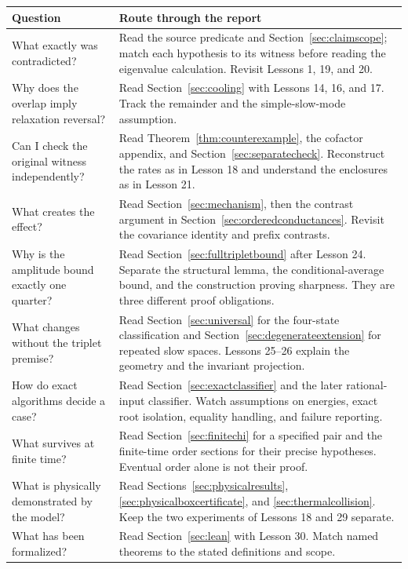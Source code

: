 \begin{longtable}{>{\raggedright\arraybackslash}p{}>{\raggedright\arraybackslash}p{}}
\toprule Question & Route through the report\\\midrule
\endhead
What exactly was contradicted? & Read the source predicate and
Section~\ref{sec:claimscope}; match each hypothesis to its witness before
reading the eigenvalue calculation. Revisit Lessons 1, 19, and 20.\\[5pt]
Why does the overlap imply relaxation reversal? & Read
Section~\ref{sec:cooling} with Lessons 14, 16, and 17. Track the remainder
and the simple-slow-mode assumption.\\[5pt]
Can I check the original witness independently? & Read
Theorem~\ref{thm:counterexample}, the cofactor appendix, and
Section~\ref{sec:separatecheck}. Reconstruct the rates as in Lesson 18 and
understand the enclosures as in Lesson 21.\\[5pt]
What creates the effect? & Read Section~\ref{sec:mechanism}, then the
contrast argument in Section~\ref{sec:orderedconductances}. Revisit the
covariance identity and prefix contrasts.\\[5pt]
Why is the amplitude bound exactly one quarter? & Read
Section~\ref{sec:fulltripletbound} after Lesson 24. Separate the structural
lemma, the conditional-average bound, and the construction proving
sharpness. They are three different proof obligations.\\[5pt]
What changes without the triplet premise? & Read
Section~\ref{sec:universal} for the four-state classification and
Section~\ref{sec:degenerateextension} for repeated slow spaces.
Lessons 25--26 explain the geometry and the invariant projection.\\[5pt]
How do exact algorithms decide a case? & Read
Section~\ref{sec:exactclassifier} and the later rational-input classifier.
Watch assumptions on energies, exact root isolation, equality handling,
and failure reporting.\\[5pt]
What survives at finite time? & Read Section~\ref{sec:finitechi} for a
specified pair and the finite-time order sections for their precise
hypotheses. Eventual order alone is not their proof.\\[5pt]
What is physically demonstrated by the model? & Read
Sections~\ref{sec:physicalresults}, \ref{sec:physicalboxcertificate}, and
\ref{sec:thermalcollision}. Keep the two experiments of Lessons 18 and
29 separate.\\[5pt]
What has been formalized? & Read Section~\ref{sec:lean} with Lesson 30.
Match named theorems to the stated definitions and scope.\\
\bottomrule
\end{longtable}

